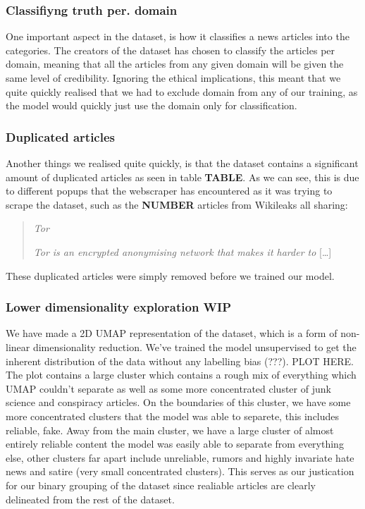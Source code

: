 

\subsubsection{Classifiyng truth per. domain}
One important aspect in the dataset, is how it classifies a news articles into the categories. The creators of the
dataset has chosen to classify the articles per domain, meaning that all the articles from any given domain will be
given the same level of credibility. Ignoring the ethical implications, this meant that we quite quickly realised that
we had to exclude domain from any of our training, as the model would quickly just use the domain only for
classification.
\subsubsection{Duplicated articles}
Another things we realised quite quickly, is that the dataset contains a significant amount of duplicated articles as
seen in table \textbf{TABLE}. As we can see, this is due to different popups that the webscraper has encountered as it
was trying to scrape the dataset, such as the \textbf{NUMBER} articles from Wikileaks all sharing:
\begin{quote}
    \textit{Tor}

    \textit{Tor is an encrypted anonymising network that makes it harder to} [\dots]\\

\end{quote}
These duplicated articles were simply removed before we trained our model.

\subsubsection{Lower dimensionality exploration WIP}
We have made a 2D UMAP representation of the dataset, which is a form of non-linear dimensionality reduction. We've trained the model unsupervised to get the inherent distribution of the data without any labelling bias (???). PLOT HERE. The plot contains a large cluster which contains a rough mix of everything which UMAP couldn't separate as well as some more concentrated cluster of junk science and conspiracy articles. On the boundaries of this cluster, we have some more concentrated clusters that the model was able to separete, this includes reliable, fake. Away from the main cluster, we have a large cluster of almost entirely reliable content the model was easily able to separate from everything else, other clusters far apart include unreliable, rumors and highly invariate hate news and satire (very small concentrated clusters). This serves as our justication for our binary grouping of the dataset since realiable articles are clearly delineated from the rest of the dataset. 



